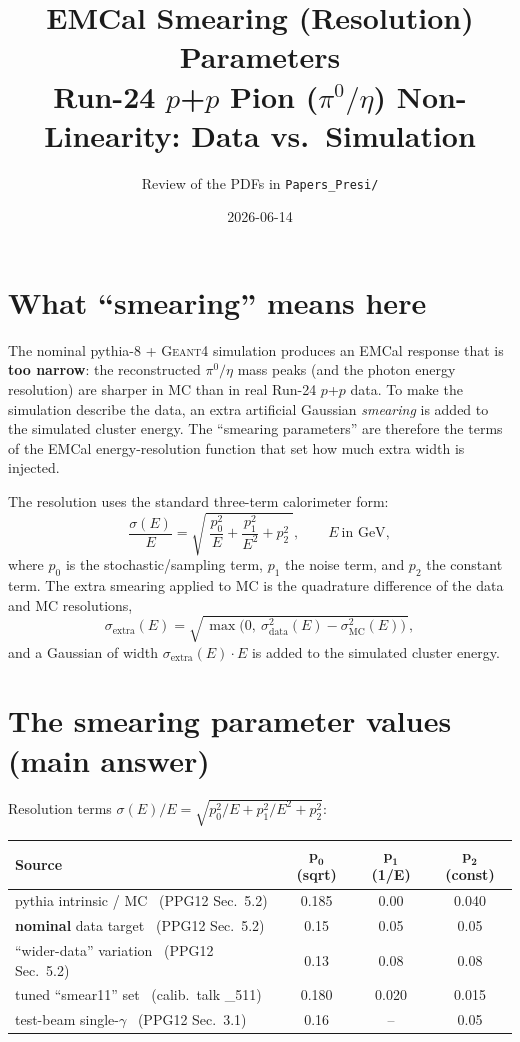 \documentclass[11pt]{article}
\title{\vspace{-1.5em}\textbf{EMCal Smearing (Resolution) Parameters}\\[2pt]
\large Run-24 $p$+$p$ Pion ($\pi^0/\eta$) Non-Linearity: Data vs.\ Simulation}
\author{Review of the PDFs in \texttt{Papers\_Presi/}}
\date{2026-06-14}
\begin{document}
\maketitle
\vspace{-1.5em}

\section{What ``smearing'' means here}
The nominal pythia-8 + \textsc{Geant4} simulation produces an EMCal response that
is \textbf{too narrow}: the reconstructed $\pi^0/\eta$ mass peaks (and the photon
energy resolution) are sharper in MC than in real Run-24 $p$+$p$ data. To make the
simulation describe the data, an extra artificial Gaussian \emph{smearing} is added
to the simulated cluster energy. The ``smearing parameters'' are therefore the terms
of the EMCal energy-resolution function that set how much extra width is injected.

The resolution uses the standard three-term calorimeter form:
\[
  \frac{\sigma(E)}{E} = \sqrt{\;\frac{p_0^2}{E} + \frac{p_1^2}{E^2} + p_2^2\;},
  \qquad E\ \text{in GeV},
\]
where $p_0$ is the stochastic/sampling term, $p_1$ the noise term, and $p_2$ the
constant term. The extra smearing applied to MC is the quadrature difference of the
data and MC resolutions,
\[
  \sigma_{\text{extra}}(E) = \sqrt{\,\max\!\big(0,\ \sigma_{\text{data}}^2(E) - \sigma_{\text{MC}}^2(E)\big)\,},
\]
and a Gaussian of width $\sigma_{\text{extra}}(E)\cdot E$ is added to the simulated
cluster energy.

\section{The smearing parameter values \textnormal{(main answer)}}
Resolution terms $\sigma(E)/E = \sqrt{p_0^2/E + p_1^2/E^2 + p_2^2}$:

\begin{center}
\renewcommand{\arraystretch}{1.25}
\begin{tabular}{l c c c}
\toprule
\textbf{Source} & $\boldsymbol{p_0}$ (sqrt) & $\boldsymbol{p_1}$ (1/E) & $\boldsymbol{p_2}$ (const) \\
\midrule
pythia intrinsic / MC \ (PPG12 Sec.~5.2)   & 0.185 & 0.00  & 0.040 \\
\textbf{nominal} data target \ (PPG12 Sec.~5.2) & 0.15  & 0.05  & 0.05  \\
``wider-data'' variation \ (PPG12 Sec.~5.2) & 0.13  & 0.08  & 0.08  \\
tuned ``smear11'' set \ (calib.\ talk \_511) & 0.180 & 0.020 & 0.015 \\
test-beam single-$\gamma$ \ (PPG12 Sec.~3.1) & 0.16  & --    & 0.05  \\
\bottomrule
\end{tabular}
\end{center}
\end{document}
